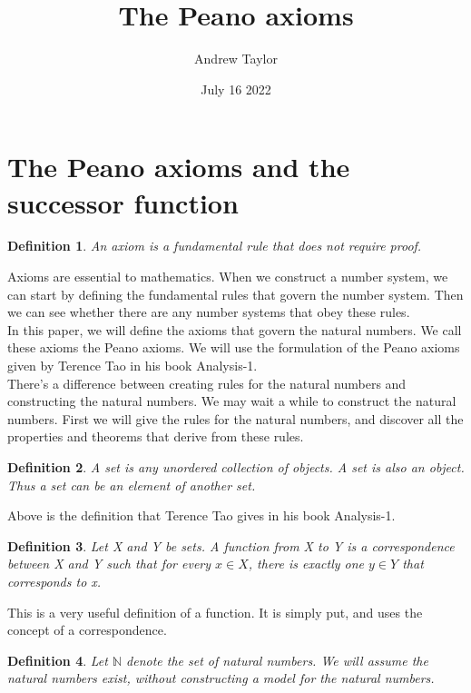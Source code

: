 \documentclass{article}
\title{The Peano axioms}
\author{Andrew Taylor}
\date{July 16 2022}
\newtheorem{definition}{Definition}
\begin{document}
\maketitle

\section{The Peano axioms and the successor function}

\begin{definition}
An axiom is a fundamental rule that does not require proof.
\end{definition}

Axioms are essential to mathematics. When we construct a number system, we can start by defining the fundamental rules that govern the number system. Then we can see whether there are any number systems that obey these rules. \\

In this paper, we will define the axioms that govern the natural numbers. We call these axioms the Peano axioms. We will use the formulation of the Peano axioms given by Terence Tao in his book Analysis-1. \\

There's a difference between creating rules for the natural numbers and constructing the natural numbers. We may wait a while to construct the natural numbers. First we will give the rules for the natural numbers, and discover all the properties and theorems that derive from these rules.

\begin{definition}
A set is any unordered collection of objects. A set is also an object. Thus a set can be an element of another set.
\end{definition}

Above is the definition that Terence Tao gives in his book Analysis-1.

\begin{definition}
Let X and Y be sets. A function from X to Y is a correspondence between X and Y such that for every $x \in X$, there is exactly one $y \in Y$ that corresponds to x. 
\end{definition}

This is a very useful definition of a function. It is simply put, and uses the concept of a correspondence.

\begin{definition}
Let $\mathbb{N}$ denote the set of natural numbers. We will assume the natural numbers exist, without constructing a model for the natural numbers.
\end{definition}
\end{document}
